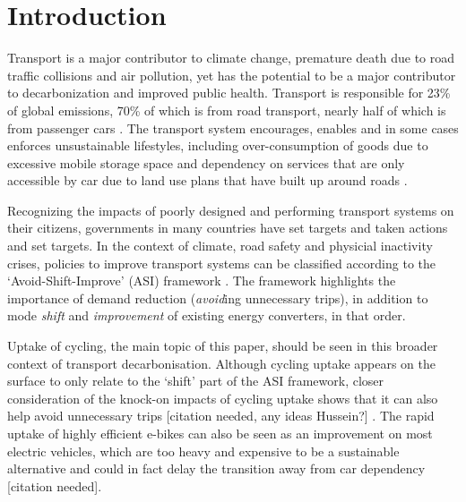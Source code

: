 \documentclass[
  super,
  preprint,
  3p]{elsarticle}
\begin{document}
    \ifdefined\Shaded\renewenvironment{Shaded}{\begin{tcolorbox}[interior hidden, breakable, sharp corners, boxrule=0pt, frame hidden, borderline west={3pt}{0pt}{shadecolor}, enhanced]}{\end{tcolorbox}}\fi

\newpage{}

\hypertarget{introduction}{%
\section{Introduction}\label{introduction}}

Transport is a major contributor to climate change, premature death due
to road traffic collisions and air pollution, yet has the potential to
be a major contributor to decarbonization and improved public health.
Transport is responsible for 23\% of global emissions, 70\% of which is
from road transport, nearly half of which is from passenger cars
\citep{jaramillo2022}. The transport system encourages, enables and in
some cases enforces unsustainable lifestyles, including over-consumption
of goods due to excessive mobile storage space and dependency on
services that are only accessible by car due to land use plans that have
built up around roads \citep{gray2001, shergold2012, motte-baumvol2010}.

Recognizing the impacts of poorly designed and performing transport
systems on their citizens, governments in many countries have set
targets and taken actions and set targets. In the context of climate,
road safety and physicial inactivity crises, policies to improve
transport systems can be classified according to the
`Avoid-Shift-Improve' (ASI) framework \citep{jaramillo2022}. The
framework highlights the importance of demand reduction (\emph{avoid}ing
unnecessary trips), in addition to mode \emph{shift} and
\emph{improvement} of existing energy converters, in that order.

Uptake of cycling, the main topic of this paper, should be seen in this
broader context of transport decarbonisation. Although cycling uptake
appears on the surface to only relate to the `shift' part of the ASI
framework, closer consideration of the knock-on impacts of cycling
uptake shows that it can also help avoid unnecessary trips {[}citation
needed, any ideas Hussein?{]} . The rapid uptake of highly efficient
e-bikes can also be seen as an improvement on most electric vehicles,
which are too heavy and expensive to be a sustainable alternative and
could in fact delay the transition away from car dependency {[}citation
needed{]}.
\end{document}

